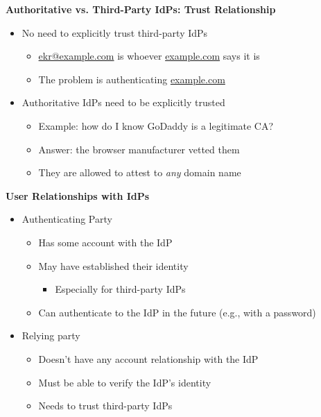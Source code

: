 \documentclass[helvetica]{seminar}
\newcommand{\heading}[1]{%
  \begin{center} 
    \large\bf 
    #1 
  \end{center} 
  \vspace{.4 in}}
\begin{document}
\begin{slide}
\heading{Authoritative vs. Third-Party IdPs: Trust Relationship}

\begin{itemize}
\item No need to explicitly trust third-party IdPs
  \begin{itemize}
  \item \url{ekr@example.com} is whoever \url{example.com} says it is
  \item The problem is authenticating \url{example.com}
  \end{itemize}

\item Authoritative IdPs need to be explicitly trusted
  \begin{itemize}
  \item Example: how do I know GoDaddy is a legitimate CA?
  \item Answer: the browser manufacturer vetted them
  \item They are allowed to attest to \emph{any} domain name
  \end{itemize}
\end{itemize}
\end{slide}


\begin{slide}
\heading{User Relationships with IdPs}

\begin{itemize}
\item Authenticating Party
  \begin{itemize}
  \item Has some account with the IdP
  \item May have established their identity 
    \begin{itemize}
    \item Especially for third-party IdPs
    \end{itemize}
  \item Can authenticate to the IdP in the future (e.g., with a password)
  \end{itemize}

\item Relying party
  \begin{itemize}
  \item Doesn't have any account relationship with the IdP
  \item Must be able to verify the IdP's identity
  \item Needs to trust third-party IdPs
  \end{itemize}

\end{itemize}
\end{slide}
\end{document}
